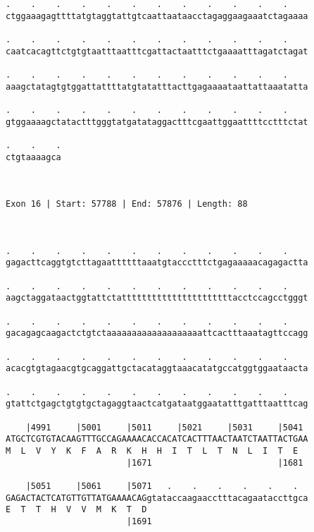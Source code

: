 \documentclass{article}
\begin{document}
\begin{Verbatim}
.    .    .    .    .    .    .    .    .    .    .    .    
ctggaaagagttttatgtaggtattgtcaattaataacctagaggaagaaatctagaaaa
                                                            
.    .    .    .    .    .    .    .    .    .    .    .    
caatcacagttctgtgtaatttaatttcgattactaatttctgaaaatttagatctagat
                                                            
.    .    .    .    .    .    .    .    .    .    .    .    
aaagctatagtgtggattattttatgtatatttacttgagaaaataattattaaatatta
                                                            
.    .    .    .    .    .    .    .    .    .    .    .    
gtggaaaagctatactttgggtatgatataggactttcgaattggaattttcctttctat
                                                            
.    .    .
ctgtaaaagca
           
           
 
Exon 16 | Start: 57788 | End: 57876 | Length: 88



.    .    .    .    .    .    .    .    .    .    .    .    
gagacttcaggtgtcttagaattttttaaatgtaccctttctgagaaaaacagagactta
                                                            
.    .    .    .    .    .    .    .    .    .    .    .    
aagctaggataactggtattctattttttttttttttttttttttacctccagcctgggt
                                                            
.    .    .    .    .    .    .    .    .    .    .    .    
gacagagcaagactctgtctaaaaaaaaaaaaaaaaaaattcactttaaatagttccagg
                                                            
.    .    .    .    .    .    .    .    .    .    .    .    
acacgtgtagaacgtgcaggattgctacataggtaaacatatgccatggtggaataacta
                                                            
.    .    .    .    .    .    .    .    .    .    .    .    
gtattctgagctgtgtgctagaggtaactcatgataatggaatatttgatttaatttcag
                                                            
    |4991     |5001     |5011     |5021     |5031     |5041 
ATGCTCGTGTACAAGTTTGCCAGAAAACACCACATCACTTTAACTAATCTAATTACTGAA
M  L  V  Y  K  F  A  R  K  H  H  I  T  L  T  N  L  I  T  E  
                        |1671                         |1681 
  
    |5051     |5061     |5071   .    .    .    .    .    .  
GAGACTACTCATGTTGTTATGAAAACAGgtataccaagaacctttacagaataccttgca
E  T  T  H  V  V  M  K  T  D                                
                        |1691                               
  

\end{Verbatim}
\end{document}
